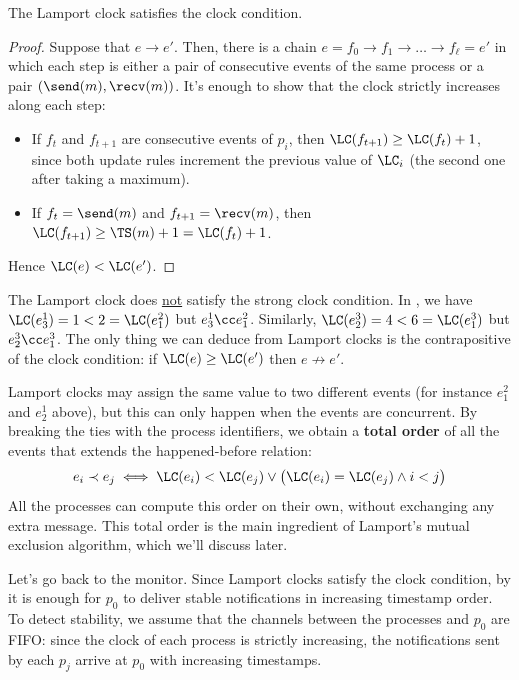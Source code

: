 \begin{framedprop}{}
  The Lamport clock satisfies the clock condition.
\end{framedprop}

\begin{proof}
  Suppose that $e \to e'$. Then, there is a chain $e = f_0 \to f_1 \to \ldots \to f_\ell = e'$ in which each step is either a pair of consecutive events of the same process or a pair $(\send(m), \recv(m))$. It's enough to show that the clock strictly increases along each step:
  \begin{itemize}
    \item If $f_t$ and $f_{t+1}$ are consecutive events of $p_i$, then $\LC(f_{t+1}) \geq \LC(f_t) + 1$, since both update rules increment the previous value of $\LC_i$ (the second one after taking a maximum).
    \item If $f_t = \send(m)$ and $f_{t+1} = \recv(m)$, then $\LC(f_{t+1}) \geq \TS(m) + 1 = \LC(f_t) + 1$.
  \end{itemize}
  Hence $\LC(e) < \LC(e')$.
\end{proof}

\begin{framedobs}{}
  The Lamport clock does \underline{not} satisfy the strong clock condition. In , we have $\LC(e_3^1) = 1 < 2 = \LC(e_1^2)$ but $e_3^1 \cc e_1^2$. Similarly, $\LC(e_2^3) = 4 < 6 = \LC(e_1^3)$ but $e_2^3 \cc e_1^3$. The only thing we can deduce from Lamport clocks is the contrapositive of the clock condition: if $\LC(e) \geq \LC(e')$ then $e \not\to e'$.
\end{framedobs}

Lamport clocks may assign the same value to two different events (for instance $e_1^2$ and $e_2^1$ above), but this can only happen when the events are concurrent. By breaking the ties with the process identifiers, we obtain a \textbf{total order} of all the events that extends the happened-before relation:
\[e_i \prec e_j \iff \LC(e_i) < \LC(e_j) \lor \big(\LC(e_i) = \LC(e_j) \land i < j\big)\]
All the processes can compute this order on their own, without exchanging any extra message. This total order is the main ingredient of Lamport's mutual exclusion algorithm, which we'll discuss later.

Let's go back to the monitor. Since Lamport clocks satisfy the clock condition, by  it is enough for $p_0$ to deliver stable notifications in increasing timestamp order. To detect stability, we assume that the channels between the processes and $p_0$ are FIFO: since the clock of each process is strictly increasing, the notifications sent by each $p_j$ arrive at $p_0$ with increasing timestamps.


